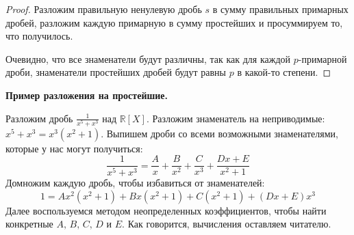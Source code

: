 \begin{proof}
    Разложим правильную ненулевую дробь $s$ в сумму правильных примарных дробей, разложим каждую примарную в сумму простейших и просуммируем то, что получилось.

    Очевидно, что все знаменатели будут различны, так как для каждой $p$-примарной дроби, знаменатели простейших дробей будут равны $p$ в какой-то степени.
\end{proof}

\vspace{7mm}

\textbf{Пример разложения на простейшие.}

Разложим дробь $\frac{1}{x^5 + x^3}$ над $\mathbb{R}[X]$. 
Разложим знаменатель на неприводимые: $x^5 + x^3 = x^3(x^2 + 1)$.
Выпишем дроби со всеми возможными знаменателями, которые у нас могут получиться:
\[ \frac{1}{x^5 + x^3} = \frac{A}{x} + \frac{B}{x^2} + \frac{C}{x^3} + \frac{Dx + E}{x^2 + 1} \]
Домножим каждую дробь, чтобы избавиться от знаменателей:
\[ 1 = Ax^2(x^2 + 1) + Bx(x^2 + 1) + C(x^2 + 1) + (Dx + E)x^3 \]
Далее воспользуемся методом неопределенных коэффициентов, чтобы найти конкретные $A, \, B, \, C, \, D$ и $E$.
Как говорится, вычисления оставляем читателю.